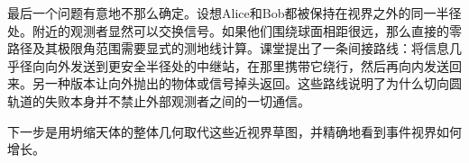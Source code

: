 最后一个问题有意地不那么确定。设想Alice和Bob都被保持在视界之外的同一半径处。附近的观测者显然可以交换信号。如果他们围绕球面相距很远，那么直接的零路径及其极限角范围需要显式的测地线计算。课堂提出了一条间接路线：将信息几乎径向向外发送到更安全半径处的中继站，在那里携带它绕行，然后再向内发送回来。另一种版本让向外抛出的物体或信号掉头返回。这些路线说明了为什么切向圆轨道的失败本身并不禁止外部观测者之间的一切通信。

\begin{classroomqa}
\end{classroomqa}

下一步是用坍缩天体的整体几何取代这些近视界草图，并精确地看到事件视界如何增长。